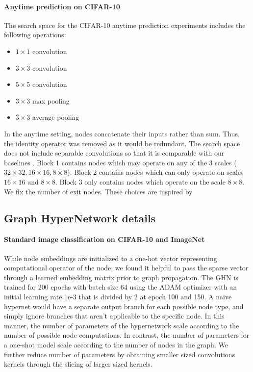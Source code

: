 \documentclass{article} %
\begin{document}
\paragraph{Anytime prediction on CIFAR-10}
The search space for the CIFAR-10 anytime prediction experiments includes the following operations:
\begin{itemize}
\item $1\times1$ convolution
\item $3\times3$  convolution
\item $5\times5$  convolution
\item $3\times3$ max pooling
\item $3\times3$ average pooling
\end{itemize}
In the anytime setting, nodes concatenate their inputs rather than sum. Thus, the identity operator was removed as it would be redundant. The search space does not include separable convolutions so that it is comparable with our baselines \citep{huang2017multi}. Block 1 contains nodes which may operate on any of the 3 scales ($32\times32, 16\times16, 8\times8$). Block 2 contains nodes which can only operate on scales $16\times16$ and $8\times 8$. Block 3 only contains nodes which operate on the scale $8\times 8$. We fix the number of exit nodes. These choices are inspired by  \cite{huang2017multi}\subsection{Graph HyperNetwork details}\paragraph{Standard image classification on CIFAR-10 and ImageNet}
While node embeddings are initialized to a one-hot vector representing computational operator of the node, we found it helpful to pass the sparse vector through a learned embedding matrix  prior to graph propagation. The GHN is trained for 200 epochs  with batch size 64 using the ADAM optimizer with an initial learning rate 1e-3 that is divided by 2 at epoch 100 and 150. A naive hypernet would have a separate output branch for each possible node type, and simply ignore branches that aren't applicable to the specific node. In this manner, the number of parameters of the hypernetwork scale according to the number of possible node computations. In contrast, the number of parameters for a one-shot model scale according to the number of nodes in the graph. We further reduce number of parameters by obtaining smaller sized convolutions kernels through the slicing of larger sized kernels. 
\end{document}
